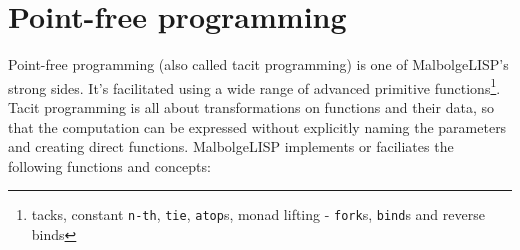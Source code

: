 \section{Point-free programming}

\par Point-free programming (also called tacit programming) is one of MalbolgeLISP's strong sides. It's facilitated using a wide range of advanced primitive functions\footnote{tacks, constant \verb|n-th|, \verb|tie|, \verb|atop|s, monad lifting - \verb|fork|s, \verb|bind|s and reverse binds}. Tacit programming is all about transformations on functions and their data, so that the computation can be expressed without explicitly naming the parameters and creating direct functions. MalbolgeLISP implements or faciliates the following functions and concepts:

